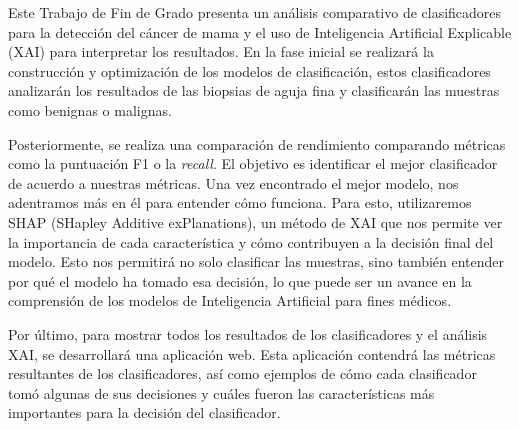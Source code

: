 Este Trabajo de Fin de Grado
presenta un análisis comparativo de clasificadores para la detección del cáncer de mama y el uso de Inteligencia Artificial Explicable (XAI) para interpretar los resultados. En la fase inicial se realizará la construcción y optimización de los modelos de clasificación, estos clasificadores analizarán los resultados de las biopsias de aguja fina y clasificarán las muestras como benignas o malignas.

Posteriormente, se realiza una comparación de rendimiento comparando métricas como la puntuación F1 o la \textit{recall}. El objetivo es identificar el mejor clasificador de acuerdo a nuestras métricas. Una vez encontrado el mejor modelo, nos adentramos más en él para entender cómo funciona. Para esto, utilizaremos SHAP (SHapley Additive exPlanations), un método de XAI que nos permite ver la importancia de cada característica y cómo contribuyen a la decisión final del modelo. Esto nos permitirá no solo clasificar las muestras, sino también entender por qué el modelo ha tomado esa decisión, lo que puede ser un avance en la comprensión de los modelos de 
Inteligencia Artificial
para fines médicos.

Por último, para mostrar todos los resultados de los clasificadores y el análisis XAI, se desarrollará una aplicación web. Esta aplicación contendrá las métricas resultantes de los clasificadores, así como ejemplos de cómo cada clasificador tomó algunas de sus decisiones y cuáles fueron las características más importantes para la decisión del clasificador.

